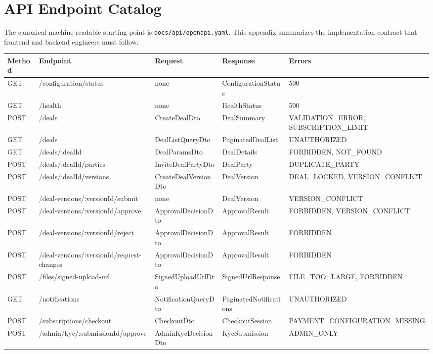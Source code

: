 \chapter{API Endpoint Catalog}
The canonical machine-readable starting point is \texttt{docs/api/openapi.yaml}. This appendix summarizes the implementation contract that frontend and backend engineers must follow.

\begin{longtable}{p{}p{}p{}p{}p{}}
\toprule
Method & Endpoint & Request & Response & Errors \\
\midrule
GET & /configuration/status & none & ConfigurationStatus & 500 \\
GET & /health & none & HealthStatus & 500 \\
POST & /deals & CreateDealDto & DealSummary & VALIDATION\_ERROR, SUBSCRIPTION\_LIMIT \\
GET & /deals & DealListQueryDto & PaginatedDealList & UNAUTHORIZED \\
GET & /deals/:dealId & DealParamsDto & DealDetails & FORBIDDEN, NOT\_FOUND \\
POST & /deals/:dealId/parties & InviteDealPartyDto & DealParty & DUPLICATE\_PARTY \\
POST & /deals/:dealId/versions & CreateDealVersionDto & DealVersion & DEAL\_LOCKED, VERSION\_CONFLICT \\
POST & /deal-versions/:versionId/submit & none & DealVersion & VERSION\_CONFLICT \\
POST & /deal-versions/:versionId/approve & ApprovalDecisionDto & ApprovalResult & FORBIDDEN, VERSION\_CONFLICT \\
POST & /deal-versions/:versionId/reject & ApprovalDecisionDto & ApprovalResult & FORBIDDEN \\
POST & /deal-versions/:versionId/request-changes & ApprovalDecisionDto & ApprovalResult & FORBIDDEN \\
POST & /files/signed-upload-url & SignedUploadUrlDto & SignedUrlResponse & FILE\_TOO\_LARGE, FORBIDDEN \\
GET & /notifications & NotificationQueryDto & PaginatedNotifications & UNAUTHORIZED \\
POST & /subscriptions/checkout & CheckoutDto & CheckoutSession & PAYMENT\_CONFIGURATION\_MISSING \\
POST & /admin/kyc/:submissionId/approve & AdminKycDecisionDto & KycSubmission & ADMIN\_ONLY \\
\bottomrule
\end{longtable}
